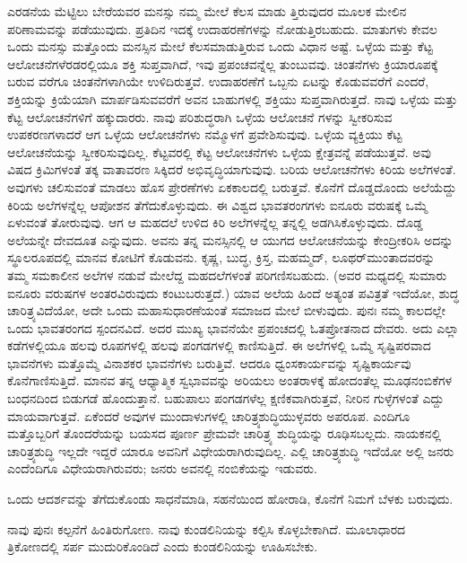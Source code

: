 ಎರಡನೆಯ ಮೆಟ್ಟಿಲು ಬೇರೆಯವರ ಮನಸ್ಸು ನಮ್ಮ ಮೇಲೆ ಕೆಲಸ ಮಾಡು ತ್ತಿರುವುದರ ಮೂಲಕ ಮೇಲಿನ ಪರಿಣಾಮವನ್ನು ಪಡೆಯುವುದು. ಪ್ರತಿದಿನ ಇದಕ್ಕೆ ಉದಾಹರಣೆಗಳನ್ನು ನೋಡುತ್ತಿರಬಹುದು. ಮಾತುಗಳು ಕೇವಲ ಒಂದು ಮನಸ್ಸು ಮತ್ತೊಂದು ಮನಸ್ಸಿನ ಮೇಲೆ ಕೆಲಸಮಾಡುತ್ತಿರುವ ಒಂದು ವಿಧಾನ ಅಷ್ಟೆ. ಒಳ್ಳೆಯ ಮತ್ತು ಕೆಟ್ಟ ಆಲೋಚನೆಗಳೆರಡರಲ್ಲಿಯೂ ಶಕ್ತಿ ಸುಪ್ತವಾಗಿದೆ, ಇವು ಪ್ರಪಂಚವನ್ನೆಲ್ಲ ತುಂಬುವವು. ಚಿಂತನೆಗಳು ಕ್ರಿಯಾರೂಪಕ್ಕೆ ಬರುವ ವರೆಗೂ ಚಿಂತನೆಗಳಾಗಿಯೇ ಉಳಿದಿರುತ್ತವೆ. ಉದಾಹರಣೆಗೆ ಒಬ್ಬನು ಏಟನ್ನು ಕೊಡುವವರೆಗೆ ಎಂದರೆ, ಶಕ್ತಿಯನ್ನು ಕ್ರಿಯೆಯಾಗಿ ಮಾರ್ಪಡಿಸುವವರೆಗೆ ಅವನ ಬಾಹುಗಳಲ್ಲಿ ಶಕ್ತಿಯು ಸುಪ್ತವಾಗಿರುತ್ತದೆ. ನಾವು ಒಳ್ಳೆಯ ಮತ್ತು ಕೆಟ್ಟ ಆಲೋಚನೆಗಳಿಗೆ ಹಕ್ಕುದಾರರು. ನಾವು ಪರಿಶುದ್ಧರಾಗಿ ಒಳ್ಳೆಯ ಆಲೋಚನೆ ಗಳನ್ನು ಸ್ವೀಕರಿಸುವ ಉಪಕರಣಗಳಾದರೆ ಆಗ ಒಳ್ಳೆಯ ಆಲೋಚನೆಗಳು ನಮ್ಮೊಳಗೆ ಪ್ರವೇಶಿಸುವುವು. ಒಳ್ಳೆಯ ವ್ಯಕ್ತಿಯು ಕೆಟ್ಟ ಆಲೋಚನೆಯನ್ನು ಸ್ವೀಕರಿಸುವುದಿಲ್ಲ. ಕೆಟ್ಟವರಲ್ಲಿ ಕೆಟ್ಟ ಆಲೋಚನೆಗಳು ಒಳ್ಳೆಯ ಕ್ಷೇತ್ರವನ್ನೆ ಪಡೆಯುತ್ತವೆ. ಅವು ವಿಷದ ಕ್ರಿಮಿಗಳಂತೆ ತಕ್ಕ ವಾತಾವರಣ ಸಿಕ್ಕಿದರೆ ಅಭಿವೃದ್ಧಿಯಾಗುವುವು. ಬರಿಯ ಆಲೋಚನೆಗಳು ಕಿರಿಯ ಅಲೆಗಳಂತೆ. ಅವುಗಳು ಚಲಿಸುವಂತೆ ಮಾಡಲು ಹೊಸ ಪ್ರೇರಣೆಗಳು ಏಕಕಾಲದಲ್ಲಿ ಬರುತ್ತವೆ. ಕೊನೆಗೆ ದೊಡ್ಡದೊಂದು ಅಲೆಯೆದ್ದು ಕಿರಿಯ ಅಲೆಗಳನ್ನೆಲ್ಲ ಆಪೋಶನ ತೆಗೆದುಕೊಳ್ಳುವುದು. ಈ ವಿಶ್ವದ ಭಾವತರಂಗಗಳು ಐನೂರು ವರುಷಕ್ಕೆ ಒಮ್ಮೆ ಏಳುವಂತೆ ತೋರುವುವು. ಆಗ ಆ ಮಹದಲೆ ಉಳಿದ ಕಿರಿ ಅಲೆಗಳನ್ನೆಲ್ಲ ತನ್ನಲ್ಲಿ ಅಡಗಿಸಿಕೊಳ್ಳುವುದು. ದೊಡ್ಡ ಅಲೆಯನ್ನೇ ದೇವದೂತ ಎನ್ನುವುದು. ಅವನು ತನ್ನ ಮನಸ್ಸಿನಲ್ಲಿ ಆ ಯುಗದ ಆಲೋಚನೆಯನ್ನು ಕೇಂದ್ರೀಕರಿಸಿ ಅದನ್ನು ಸ್ಥೂಲರೂಪದಲ್ಲಿ ಮಾನವ ಕೋಟಿಗೆ ಕೊಡುವನು. ಕೃಷ್ಣ, ಬುದ್ಧ, ಕ್ರಿಸ್ತ, ಮಹಮ್ಮದ್​, ಲೂಥರ್​ ಮುಂತಾದವರನ್ನು ತಮ್ಮ ಸಮಕಾಲೀನ ಅಲೆಗಳ ನಡುವೆ ಮೇಲೆದ್ದ ಮಹದಲೆಗಳಂತೆ ಪರಿಗಣಿಸಬಹುದು. (ಅವರ ಮಧ್ಯದಲ್ಲಿ ಸುಮಾರು ಐನೂರು ವರುಷಗಳ ಅಂತರವಿರುವುದು ಕಂಟುಬರುತ್ತದೆ.) ಯಾವ ಅಲೆಯ ಹಿಂದೆ ಅತ್ಯಂತ ಪವಿತ್ರತೆ ಇದೆಯೋ, ಶುದ್ಧ ಚಾರಿತ್ರ್ಯವಿದೆಯೋ, ಅದೇ ಒಂದು ಮಹಾಸುಧಾರಣೆಯಂತೆ ಸಮಾಜದ ಮೇಲೆ ಬೀಳುವುದು. ಪುನಃ ನಮ್ಮ ಕಾಲದಲ್ಲೇ ಒಂದು ಭಾವತರಂಗದ ಸ್ಪಂದನವಿದೆ. ಅದರ ಮುಖ್ಯ ಭಾವನೆಯೇ ಪ್ರಪಂಚದಲ್ಲಿ ಓತಪ್ರೋತನಾದ ದೇವರು. ಅದು ಎಲ್ಲಾ ಕಡೆಗಳಲ್ಲಿಯೂ ಹಲವು ರೂಪಗಳಲ್ಲಿ ಹಲವು ಪಂಗಡಗಳಲ್ಲಿ ಕಾಣಿಸುತ್ತಿದೆ. ಈ ಅಲೆಗಳಲ್ಲಿ ಒಮ್ಮೆ ಸೃಷ್ಟಿಪರವಾದ ಭಾವನೆಗಳು ಮತ್ತೊಮ್ಮೆ ವಿನಾಶಕರ ಭಾವನೆಗಳು ಬರುತ್ತಿವೆ. ಆದರೂ ಧ್ವಂಸಕಾರ್ಯವನ್ನು ಸೃಷ್ಟಿಕಾರ್ಯವು ಕೊನೆಗಾಣಿಸುತ್ತಿದೆ. ಮಾನವ ತನ್ನ ಆಧ್ಯಾತ್ಮಿಕ ಸ್ವಭಾವವನ್ನು ಅರಿಯಲು ಅಂತರಾಳಕ್ಕೆ ಹೋದಂತೆಲ್ಲ ಮೂಢನಂಬಿಕೆಗಳ ಬಂಧನದಿಂದ ಬಿಡುಗಡೆ ಹೊಂದುತ್ತಾನೆ. ಬಹುಪಾಲು ಪಂಗಡಗಳೆಲ್ಲ ಕ್ಷಣಿಕವಾಗಿರುತ್ತವೆ, ನೀರಿನ ಗುಳ್ಳೆಗಳಂತೆ ಎದ್ದು ಮಾಯವಾಗುತ್ತವೆ. ಏಕೆಂದರೆ ಅವುಗಳ ಮುಂದಾಳುಗಳಲ್ಲಿ ಚಾರಿತ್ರ್ಯಶುದ್ಧಿಯುಳ್ಳವರು ಅಪರೂಪ. ಎಂದಿಗೂ ಮತ್ತೊಬ್ಬರಿಗೆ ತೊಂದರೆಯನ್ನು ಬಯಸದ ಪೂರ್ಣ ಪ್ರೇಮವೇ ಚಾರಿತ್ರ್ಯ ಶುದ್ಧಿಯನ್ನು ರೂಢಿಸಬಲ್ಲದು. ನಾಯಕನಲ್ಲಿ ಚಾರಿತ್ರ್ಯಶುದ್ಧಿ ಇಲ್ಲದೇ ಇದ್ದರೆ ಯಾರೂ ಅವನಿಗೆ ವಿಧೇಯರಾಗಿರುವುದಿಲ್ಲ. ಎಲ್ಲಿ ಚಾರಿತ್ರ್ಯಶುದ್ಧಿ ಇದೆಯೋ ಅಲ್ಲಿ ಜನರು ಎಂದೆಂದಿಗೂ ವಿಧೇಯರಾಗಿರುವರು; ಜನರು ಅವನಲ್ಲಿ ನಂಬಿಕೆಯನ್ನು ಇಡುವರು.

ಒಂದು ಆದರ್ಶವನ್ನು ತೆಗೆದುಕೊಂಡು ಸಾಧನೆಮಾಡಿ, ಸಹನೆಯಿಂದ ಹೋರಾಡಿ, ಕೊನೆಗೆ ನಿಮಗೆ ಬೆಳಕು ಬರುವುದು.

\delimiter

ನಾವು ಪುನಃ ಕಲ್ಪನೆಗೆ ಹಿಂತಿರುಗೋಣ. ನಾವು ಕುಂಡಲಿನಿಯನ್ನು ಕಲ್ಪಿಸಿ ಕೊಳ್ಳಬೇಕಾಗಿದೆ. ಮೂಲಾಧಾರದ ತ್ರಿಕೋಣದಲ್ಲಿ ಸರ್ಪ ಮುದುರಿಕೊಂಡಿದೆ ಎಂದು ಕುಂಡಲಿನಿಯನ್ನು ಊಹಿಸಬೇಕು.

